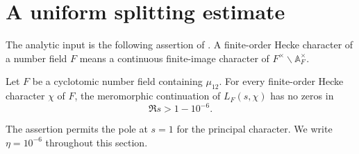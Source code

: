 \section{A uniform splitting estimate}\label{sec:splitting}

The analytic input is the following assertion of
\cite[Theorem~1.2]{PrimitiveRoot2}.  A finite-order Hecke character of a
number field \(F\) means a continuous finite-image character of
\(F^\times\backslash\mathbb A_F^\times\).

\begin{hypothesis}\label{input:hecke}
Let \(F\) be a cyclotomic number field containing \(\mu_{12}\).  For every
finite-order Hecke character \(\chi\) of \(F\), the meromorphic continuation
of \(L_F(s,\chi)\) has no zeros in
\[
                         \Re s>1-10^{-6}.
\]
\end{hypothesis}

The assertion permits the pole at \(s=1\) for the principal character.
We write \(\eta=10^{-6}\) throughout this section.

